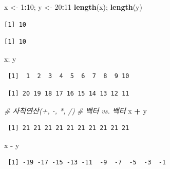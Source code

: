 \documentclass[
  11pt,
]{krantz}
\newenvironment{Shaded}{\begin{snugshade}}{\end{snugshade}}
\newcommand{\CommentTok}[1]{\textcolor[rgb]{0.37,0.37,0.37}{\textit{#1}}}
\newcommand{\DecValTok}[1]{\textcolor[rgb]{0.06,0.06,0.06}{#1}}
\newcommand{\KeywordTok}[1]{\textcolor[rgb]{0.27,0.27,0.27}{\textbf{#1}}}
\newcommand{\NormalTok}[1]{#1}
\newcommand{\OperatorTok}[1]{\textcolor[rgb]{0.43,0.43,0.43}{\textbf{#1}}}
\newcommand{\StringTok}[1]{\textcolor[rgb]{0.5,0.5,0.5}{#1}}
\begin{document}
\footnotesize

\begin{Shaded}
\begin{Highlighting}[]
\NormalTok{x <-}\StringTok{ }\DecValTok{1}\OperatorTok{:}\DecValTok{10}\NormalTok{; y <-}\StringTok{ }\DecValTok{20}\OperatorTok{:}\DecValTok{11}
\KeywordTok{length}\NormalTok{(x); }\KeywordTok{length}\NormalTok{(y)}
\end{Highlighting}
\end{Shaded}

\begin{verbatim}
[1] 10
\end{verbatim}

\begin{verbatim}
[1] 10
\end{verbatim}

\begin{Shaded}
\begin{Highlighting}[]
\NormalTok{x; y}
\end{Highlighting}
\end{Shaded}

\begin{verbatim}
 [1]  1  2  3  4  5  6  7  8  9 10
\end{verbatim}

\begin{verbatim}
 [1] 20 19 18 17 16 15 14 13 12 11
\end{verbatim}

\begin{Shaded}
\begin{Highlighting}[]
\CommentTok{# 사칙연산(+, -, *, /)}
\CommentTok{# 백터 vs. 백터}
\NormalTok{x }\OperatorTok{+}\StringTok{ }\NormalTok{y}
\end{Highlighting}
\end{Shaded}

\begin{verbatim}
 [1] 21 21 21 21 21 21 21 21 21 21
\end{verbatim}

\begin{Shaded}
\begin{Highlighting}[]
\NormalTok{x }\OperatorTok{-}\StringTok{ }\NormalTok{y}
\end{Highlighting}
\end{Shaded}

\begin{verbatim}
 [1] -19 -17 -15 -13 -11  -9  -7  -5  -3  -1
\end{verbatim}
\end{document}
